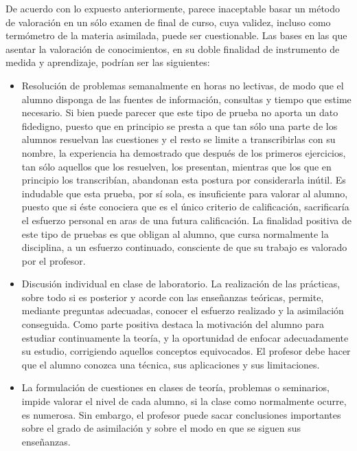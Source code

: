 De acuerdo con lo expuesto anteriormente, parece inaceptable basar un método de valoración en un sólo examen de final de curso, cuya validez, incluso como termómetro de la materia asimilada, puede ser cuestionable. Las bases en las que asentar la valoración de conocimientos, en su doble finalidad de instrumento de medida y aprendizaje, podrían ser las siguientes:
\begin{itemize}
\item	Resolución de problemas semanalmente en horas no lectivas, de modo que el alumno disponga de las fuentes de información, consultas y tiempo que estime necesario. Si bien puede parecer que este tipo de prueba no aporta un dato fidedigno, puesto que en principio se presta a que tan sólo una parte de los alumnos resuelvan las cuestiones y el resto se limite a transcribirlas con su nombre, la experiencia ha demostrado que después de los primeros ejercicios, tan sólo aquellos que los resuelven, los presentan, mientras que los que en principio los transcribían, abandonan esta postura por considerarla inútil. Es indudable que esta prueba, por sí sola, es insuficiente para valorar al alumno, puesto que si éste conociera que es el único criterio de calificación, sacrificaría el esfuerzo personal en aras de una futura calificación. La finalidad positiva de este tipo de pruebas es que obligan al alumno, que cursa normalmente la disciplina, a un esfuerzo continuado, consciente de que su trabajo es valorado por el profesor.
\item	Discusión individual en clase de laboratorio. La realización de las prácticas, sobre todo si es posterior y acorde con las enseñanzas teóricas, permite, mediante preguntas adecuadas, conocer el esfuerzo realizado y la asimilación conseguida. Como parte positiva destaca la motivación del alumno para estudiar continuamente la teoría, y la oportunidad de enfocar adecuadamente su estudio, corrigiendo aquellos conceptos equivocados. El profesor debe hacer que el alumno conozca una técnica, sus aplicaciones y sus limitaciones.

\item	La formulación de cuestiones en clases de teoría, problemas o seminarios, impide valorar el nivel de cada alumno, si la clase como normalmente ocurre, es numerosa. Sin embargo, el profesor puede sacar conclusiones importantes sobre el grado de asimilación y sobre el modo en que se siguen sus enseñanzas.


\end{itemize}
